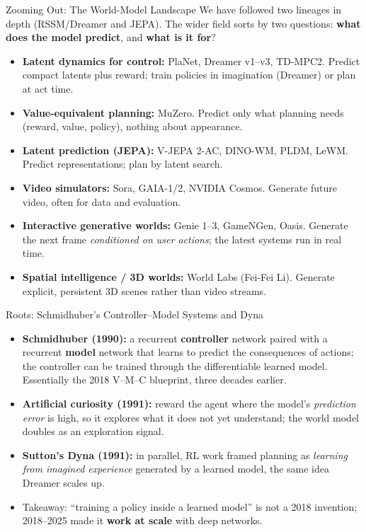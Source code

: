 \begin{frame}{Zooming Out: The World-Model Landscape}
  We have followed two lineages in depth (RSSM/Dreamer and JEPA). The wider field sorts by two questions: \textbf{what does the model predict}, and \textbf{what is it for}?
  \begin{itemize}\itemsep0.12em
    \item \textbf{Latent dynamics for control:} PlaNet, Dreamer v1--v3, TD-MPC2. Predict compact latents plus reward; train policies in imagination (Dreamer) or plan at act time.
    \item \textbf{Value-equivalent planning:} MuZero. Predict only what planning needs (reward, value, policy), nothing about appearance.
    \item \textbf{Latent prediction (JEPA):} V-JEPA 2-AC, DINO-WM, PLDM, LeWM. Predict representations; plan by latent search.
    \item \textbf{Video simulators:} Sora, GAIA-1/2, NVIDIA Cosmos. Generate future video, often for data and evaluation.
    \item \textbf{Interactive generative worlds:} Genie 1--3, GameNGen, Oasis. Generate the next frame \emph{conditioned on user actions}; the latest systems run in real time.
    \item \textbf{Spatial intelligence / 3D worlds:} World Labs (Fei-Fei Li). Generate explicit, persistent 3D scenes rather than video streams.
  \end{itemize}
\end{frame}

\begin{frame}{Roots: Schmidhuber's Controller--Model Systems and Dyna}
  \begin{itemize}\itemsep0.28em
    \item \textbf{Schmidhuber (1990):} a recurrent \textbf{controller} network paired with a recurrent \textbf{model} network that learns to predict the consequences of actions; the controller can be trained through the differentiable learned model. Essentially the 2018 V--M--C blueprint, three decades earlier.
    \item \textbf{Artificial curiosity (1991):} reward the agent where the model's \emph{prediction error} is high, so it explores what it does not yet understand; the world model doubles as an exploration signal.
    \item \textbf{Sutton's Dyna (1991):} in parallel, RL work framed planning as \emph{learning from imagined experience} generated by a learned model, the same idea Dreamer scales up.
    \item Takeaway: ``training a policy inside a learned model'' is not a 2018 invention; 2018--2025 made it \textbf{work at scale} with deep networks.
  \end{itemize}
\end{frame}


